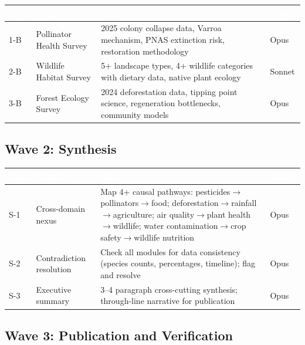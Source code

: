\documentclass[11pt,letterpaper]{article}
\newcommand{\tableheader}[1]{\textbf{\sffamily\textcolor{white}{#1}}}
\begin{document}
\begin{center}
\begin{tabularx}{\textwidth}{L{2cm}L{3cm}XC{1.5cm}}
\toprule
{}
\tableheader{Task} & \tableheader{Output} & \tableheader{Spec} & \tableheader{Model} \\
-B & Pollinator Health Survey & 2025 colony collapse data, Varroa mechanism, PNAS extinction risk, restoration methodology & Opus \\
2-B & Wildlife Habitat Survey & 5+ landscape types, 4+ wildlife categories with dietary data, native plant ecology & Sonnet \\
3-B & Forest Ecology Survey & 2024 deforestation data, tipping point science, regeneration bottlenecks, community models & Opus \\
\bottomrule
\end{tabularx}
\end{center}

\subsection{Wave 2: Synthesis}

\begin{center}
\begin{tabularx}{\textwidth}{L{2cm}L{3.5cm}XC{1.5cm}}
\toprule
{}
\tableheader{Task} & \tableheader{Output} & \tableheader{Spec} & \tableheader{Model} \\
\midrule
S-1 & Cross-domain nexus & Map 4+ causal pathways: pesticides$\to$pollinators$\to$food; deforestation$\to$rainfall$\to$agriculture; air quality$\to$plant health$\to$wildlife; water contamination$\to$crop safety$\to$wildlife nutrition & Opus \\
S-2 & Contradiction resolution & Check all modules for data consistency (species counts, percentages, timeline); flag and resolve & Opus \\
S-3 & Executive summary & 3--4 paragraph cross-cutting synthesis; through-line narrative for publication & Opus \\
\bottomrule
\end{tabularx}
\end{center}

\subsection{Wave 3: Publication and Verification}
\end{document}
